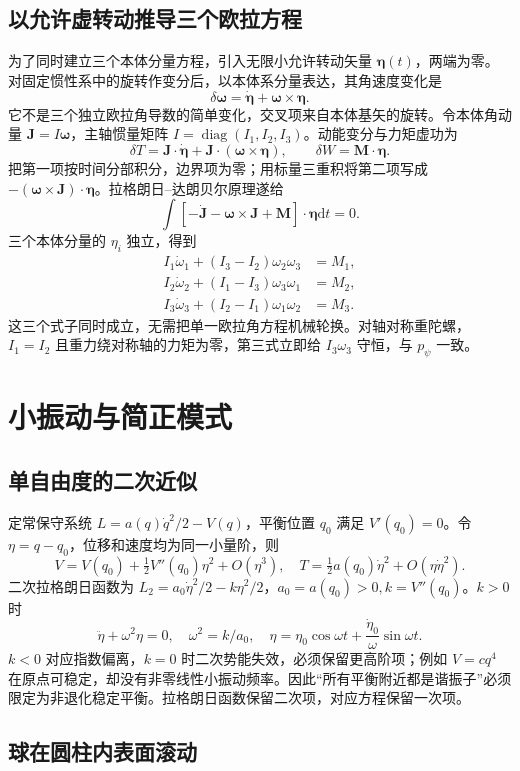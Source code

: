 \documentclass[UTF8,zihao=-4,fontset=fandol,a4paper]{ctexart}
\newcommand{\vect}[1]{\bm{#1}}\newcommand{\dd}{\mathrm d}\newcommand{\pd}{\partial}
\begin{document}
\subsection{以允许虚转动推导三个欧拉方程}
为了同时建立三个本体分量方程，引入无限小允许转动矢量 $\vect\eta(t)$，两端为零。对固定惯性系中的旋转作变分后，以本体系分量表达，其角速度变化是
\[
\delta\vect\omega=\dot{\vect\eta}+\vect\omega\times\vect\eta.
\]
它不是三个独立欧拉角导数的简单变化，交叉项来自本体基矢的旋转。令本体角动量 $\vect J=I\vect\omega$，主轴惯量矩阵 $I=\operatorname{diag}(I_1,I_2,I_3)$。动能变分与力矩虚功为
\[
\delta T=\vect J\cdot\dot{\vect\eta}+\vect J\cdot(\vect\omega\times\vect\eta),
\qquad \delta W=\vect M\cdot\vect\eta.
\]
把第一项按时间分部积分，边界项为零；用标量三重积将第二项写成 $-(\vect\omega\times\vect J)\cdot\vect\eta$。拉格朗日--达朗贝尔原理遂给
\[
\int[-\dot{\vect J}-\vect\omega\times\vect J+\vect M]\cdot\vect\eta\dd t=0.
\]
三个本体分量的 $\eta_i$ 独立，得到
\begin{align*}
I_1\dot\omega_1+(I_3-I_2)\omega_2\omega_3&=M_1,\\
I_2\dot\omega_2+(I_1-I_3)\omega_3\omega_1&=M_2,\\
I_3\dot\omega_3+(I_2-I_1)\omega_1\omega_2&=M_3.
\end{align*}
这三个式子同时成立，无需把单一欧拉角方程机械轮换。对轴对称重陀螺，$I_1=I_2$ 且重力绕对称轴的力矩为零，第三式立即给 $I_3\omega_3$ 守恒，与 $p_\psi$ 一致。


\section{小振动与简正模式}\label{sec:oscillations}
\subsection{单自由度的二次近似}
定常保守系统 $L=a(q)\dot q^2/2-V(q)$，平衡位置 $q_0$ 满足 $V'(q_0)=0$。令 $\eta=q-q_0$，位移和速度均为同一小量阶，则
\[
V=V(q_0)+\tfrac12V''(q_0)\eta^2+O(\eta^3),
\quad T=\tfrac12a(q_0)\dot\eta^2+O(\eta\dot\eta^2).
\]
二次拉格朗日函数为 $L_2=a_0\dot\eta^2/2-k\eta^2/2$，$a_0=a(q_0)>0,k=V''(q_0)$。$k>0$ 时
\[
\ddot\eta+\omega^2\eta=0,\quad\omega^2=k/a_0,
\quad\eta=\eta_0\cos\omega t+\frac{\dot\eta_0}{\omega}\sin\omega t.
\]
$k<0$ 对应指数偏离，$k=0$ 时二次势能失效，必须保留更高阶项；例如 $V=cq^4$ 在原点可稳定，却没有非零线性小振动频率。因此“所有平衡附近都是谐振子”必须限定为非退化稳定平衡。拉格朗日函数保留二次项，对应方程保留一次项。
\subsection{球在圆柱内表面滚动}
\end{document}
